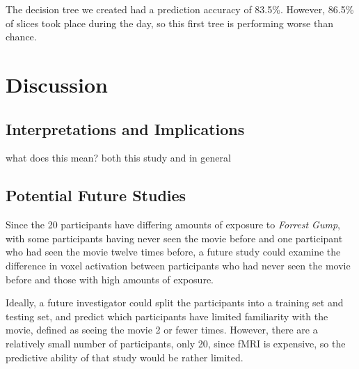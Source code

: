 \documentclass[11pt]{article}
\begin{document}
The decision tree we created had a prediction accuracy of 83.5\%.  However,
86.5\% of slices took place during the day, so this first tree is performing
worse than chance.

\section{Discussion}

\subsection{Interpretations and Implications}
what does this mean? both this study and in general
\subsection{Potential Future Studies}

Since the 20 participants have differing amounts of exposure to \emph{Forrest 
Gump}, with some participants having never seen the movie before and one 
participant who had seen the movie twelve times before, a future study could 
examine the difference in voxel activation between participants who had never 
seen the movie before and those with high amounts of exposure.

Ideally, a future investigator could split the participants into a training
set and testing set, and predict which participants have limited familiarity
with the movie, defined as seeing the movie 2 or fewer times.  However, there
are a relatively small number of participants, only 20, since fMRI is
expensive, so the predictive ability of that study would be rather limited.



\end{document}
